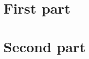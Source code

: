\documentclass[twoside,onecolumn,openright,10pt]{memoir}
\begin{document}



\part{First part}


\part{Second part}


\beginappendix



\end{document}
